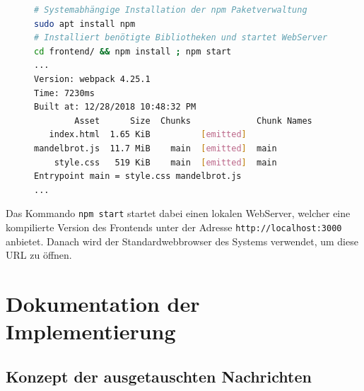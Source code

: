 \begin{figure}[h!]
	\begin{lstlisting}[language=bash, caption={Starten des Frontends mit beispielhafter Ausgabe}]
# Systemabhängige Installation der npm Paketverwaltung
sudo apt install npm
# Installiert benötigte Bibliotheken und startet WebServer
cd frontend/ && npm install ; npm start
...
Version: webpack 4.25.1
Time: 7230ms
Built at: 12/28/2018 10:48:32 PM
        Asset      Size  Chunks             Chunk Names
   index.html  1.65 KiB          [emitted]
mandelbrot.js  11.7 MiB    main  [emitted]  main
    style.css   519 KiB    main  [emitted]  main
Entrypoint main = style.css mandelbrot.js
...
        \end{lstlisting}
\end{figure}

Das Kommando \verb|npm start| startet dabei einen lokalen WebServer, welcher eine kompilierte Version des Frontends
unter der Adresse \verb|http://localhost:3000| anbietet. Danach wird der Standardwebbrowser des Systems verwendet, um diese
URL zu öffnen.



\section{Dokumentation der Implementierung}

\subsection{Konzept der ausgetauschten Nachrichten}

